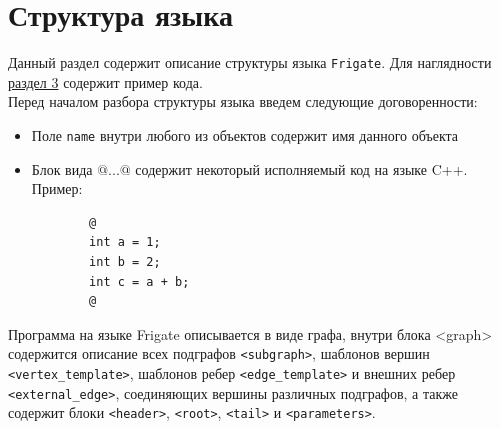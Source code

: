 \documentclass[a4paper, 12pt]{article}
\newcommand{\cd}[1]{\lstinline$#1$}
\begin{document}
	\section{Структура языка}
	Данный раздел содержит описание структуры языка \cd{Frigate}. Для наглядности \hyperref[sec_3]{раздел 3} содержит пример кода.\\
	Перед началом разбора структуры языка введем следующие договоренности:
	\begin{itemize}
		\item Поле \lstinline$name$ внутри любого из объектов содержит имя данного объекта
		\item Блок вида $@$...$@$ содержит некоторый исполняемый код на языке C++. Пример:
		\begin{lstlisting}
		@
		int a = 1;
		int b = 2;
		int c = a + b;
		@
		\end{lstlisting}
	\end{itemize}
	Программа на языке Frigate описывается в виде графа, внутри блока <graph> содержится описание всех подграфов \lstinline$<subgraph>$, шаблонов вершин \lstinline$<vertex_template>$, шаблонов ребер \lstinline$<edge_template>$ и внешних ребер \lstinline$<external_edge>$, соединяющих вершины различных подграфов, а также содержит блоки \lstinline$<header>$, \lstinline$<root>$, \lstinline$<tail>$ и \cd{<parameters>}. 
\end{document}
